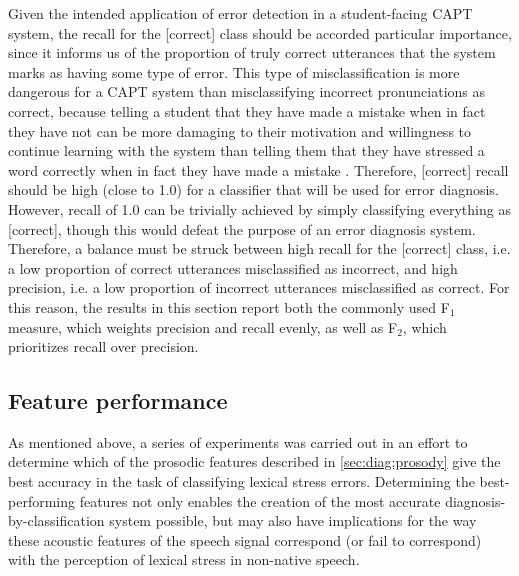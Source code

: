 	Given the intended application of error detection in a student-facing CAPT system, the recall for the [correct] class should be accorded particular importance, since it informs us of the proportion of truly correct utterances that the system marks as having some type of error. This type of misclassification is more dangerous for a CAPT system than misclassifying incorrect pronunciations as correct, because telling a student that they have made a mistake when in fact they have not can be more damaging to their motivation and willingness to continue learning with the system than telling them that they have stressed a word correctly when in fact they have made a mistake \citep{Neri2002}. Therefore, [correct] recall should be high (close to 1.0) for a classifier that will be used for error diagnosis. However, recall of 1.0 can be trivially achieved by simply classifying everything as [correct], though this would defeat the purpose of an error diagnosis system. Therefore, a balance must be struck between high recall  for the [correct] class, i.e. a low proportion of correct utterances misclassified as incorrect, and high precision, i.e. a low proportion of incorrect utterances misclassified as correct. 
	For this reason, the results in this section report both the commonly used F$_1$ measure, which weights precision and recall evenly, as well as F$_2$, which prioritizes recall over precision.
	
	 
	

		
	\subsection{Feature performance}
	\label{sec:classification:features}
	
		As mentioned above, a series of experiments was carried out in an effort to determine which of the prosodic features described in \cref{sec:diag:prosody} give the best accuracy in the task of classifying lexical stress errors. Determining the best-performing features not only enables the creation of the most accurate diagnosis-by-classification system possible, but may also have implications for the way these acoustic features of the speech signal correspond (or fail to correspond) with the perception of lexical stress in non-native speech. 
		
